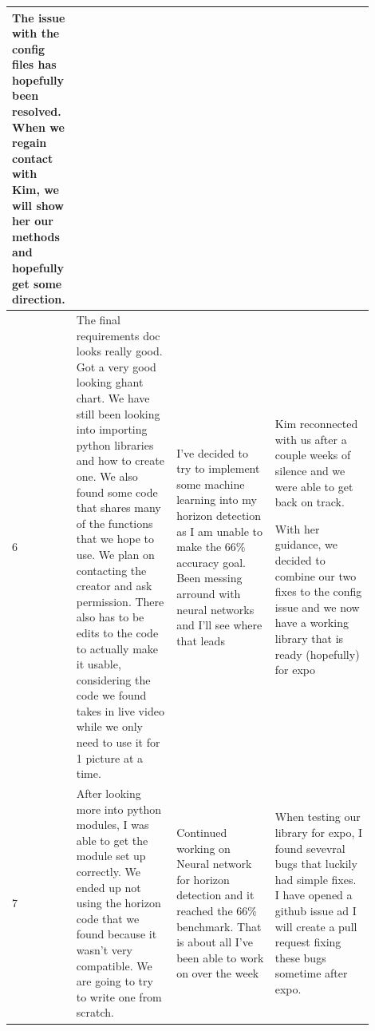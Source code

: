 \documentclass[onecolumn, draftclsnofoot,10pt, compsoc]{IEEEtran}
\begin{document}
\begin{singlespace}
\begin{longtable}{|l|p{0.3\linewidth}|p{0.3\linewidth}|p{0.3\linewidth}|}
The issue with the config files has hopefully been resolved. When we regain contact with Kim, we will show her our methods and hopefully get some direction. 
			\\\hline
			6 & 
The final requirements doc looks really good. Got a very good looking ghant chart. 
We have still been looking into importing python libraries and how to create one. 
We also found some code that shares many of the functions that we hope to use. We plan on contacting the creator and ask permission. There also has to be edits to the code to actually make it usable, considering the code we found takes in live video while we only need to use it for 1 picture at a time. 
& I've decided to try to implement some machine learning into my horizon detection as I am unable to make the 66\% accuracy goal. Been messing arround with neural networks and I'll see where that leads
 & Kim reconnected with us after a couple weeks of silence and we were able to get back on track.

With her guidance, we decided to combine our two fixes to the config issue and we now have a working library that is ready (hopefully) for expo
			\\\hline
			7 & After looking more into python modules, I was able to get the module set up correctly.
We ended up not using the horizon code that we found because it wasn't very compatible. We are going to try to write one from scratch. & Continued working on Neural network for horizon detection and it reached the 66\% benchmark. That is about all I've been able to work on over the week & When testing our library for expo, I found sevevral bugs that luckily had simple fixes. I have opened a github issue ad I will create a pull request fixing these bugs sometime after expo.


\end{longtable}
\end{singlespace}
\end{document}
